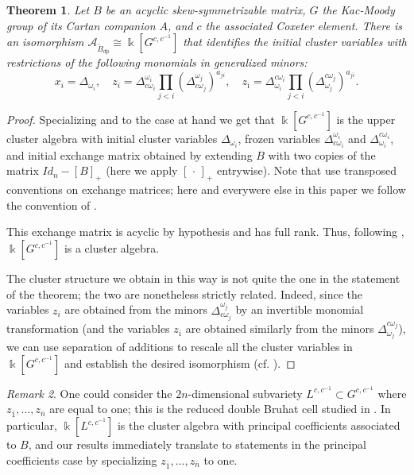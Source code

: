 \documentclass[12pt]{amsart}
\newcommand{\cA}{\mathcal{A}}
\newcommand{\kk}{\Bbbk}
\newcommand{\ol}[1]{\overline{#1}}
\newcommand{\Bdp}{\widetilde{B}_{dp}}
\newcommand{\cvar}{z}
\newtheorem{theorem}{Theorem}[section]
\theoremstyle{remark}
\newtheorem{remark}[theorem]{Remark}
\numberwithin{equation}{section}
\numberwithin{figure}{section}
\begin{document}
\begin{theorem}
  \label{thm:coordring}
  Let $B$ be an acyclic skew-symmetrizable matrix, $G$ the Kac-Moody group of its Cartan companion $A$, and $c$ the associated Coxeter element.
  There is an isomorphism $\cA_{\Bdp} \cong \kk[G^{c,c^{-1}}]$ that identifies the initial cluster variables with restrictions of the following monomials in generalized minors:
  \begin{equation}
    \label{eq:initialcluster}
    x_i = \Delta_{\omega_i},
    \quad 
    \cvar_i = \Delta^{\omega_i}_{ c\omega_i} \prod_{j < i}(\Delta^{\omega_j}_{c \omega_j})^{a_{ji}},
    \quad 
    \cvar_{\ol{\imath}} = \Delta^{c \omega_i}_{\omega_i} \prod_{j < i}(\Delta^{c \omega_j}_{\omega_j})^{a_{ji}}.
  \end{equation}
\end{theorem}
\begin{proof}
  Specializing \cite[Theorem 2.10]{BFZ05} and \cite[Theorem 4.9]{Wil13} to the case at hand we get that $\kk[G^{c,c^{-1}}]$ is the upper cluster algebra with initial cluster variables $\Delta_{\omega_i}$, frozen variables $\Delta_{c\omega_i}^{\omega_i}$ and $\Delta_{\omega_i}^{c\omega_i}$, and initial exchange matrix obtained by extending $B$ with two copies of the matrix $Id_n-[B]_+$ (here we apply $[\,\cdot\,]_+$ entrywise).
  Note that \cite{BFZ05,Wil13} use transposed conventions on exchange matrices; here and everywere else in this paper we follow the convention of \cite{BFZ05}.

  This exchange matrix is acyclic by hypothesis and has full rank.
  Thus, following \cite[Corollary 1.19]{BFZ05}, $\kk[G^{c,c^{-1}}]$ is a cluster algebra.

  The cluster structure we obtain in this way is not quite the one in the statement of the theorem; the two are nonetheless strictly related.
  Indeed, since the variables $\cvar_i$ are obtained from the minors $\Delta^{\omega_j}_{ c\omega_j}$ by an invertible monomial transformation (and the variables $\cvar_{\ol{\imath}}$ are obtained similarly from the minors $\Delta^{c \omega_j}_{\omega_j}$), we can use separation of additions to rescale all the cluster variables in $\kk[G^{c,c^{-1}}]$ and establish the desired isomorphism (cf. \cite[Proposition 4.5]{YZ08}).
\end{proof}
\begin{remark}
  One could consider the $2n$-dimensional subvariety $L^{c,c^{-1}} \subset G^{c,c^{-1}}$ where $z_{\ol{1}},\dotsc,z_{\ol{n}}$ are equal to one; this is the reduced double Bruhat cell studied in \cite{YZ08}.
  In particular, $\kk[L^{c,c^{-1}}]$ is the cluster algebra with principal coefficients associated to $B$, and our results immediately translate to statements in the principal coefficients case by specializing $\cvar_{\ol{1}},\dotsc,\cvar_{\ol{n}}$ to one.
\end{remark}
\end{document}

